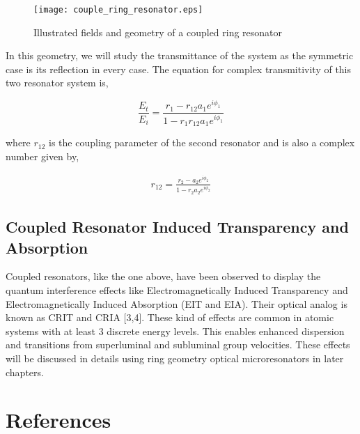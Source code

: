 \begin{figure}[h]
\centering
\texttt{[image: couple\_ring\_resonator.eps]}
\caption{Illustrated fields and geometry of a coupled ring resonator}
\end{figure}

In this geometry, we will study the transmittance of the system as the symmetric case is its reflection in every case. The equation for complex transmitivity of this two resonator system is,

\begin{equation}
\frac{E_{t}}{E_{i}} = \frac{r_{1} - r_{12} a_{1} e^{i\phi_{1}}}{1 - r_{1} r_{12} a_{1} e^{i\phi_{1}}}
\end{equation}

where $r_{12}$ is the coupling parameter of the second resonator and is also a complex number given by,

\begin{align*}
r_{12} = \frac{r_{2} - a_{2} e^{i\phi_{2}}}{1 - r_{2} a_{2} e^{i\phi_{2}}}
\end{align*}


\subsection{Coupled Resonator Induced Transparency and Absorption}
Coupled resonators, like the one above, have been observed to display the quantum interference effects like Electromagnetically Induced Transparency and Electromagnetically Induced Absorption (EIT and EIA). Their optical analog is known as CRIT and CRIA [3,4]. These kind of effects are common in atomic systems with at least 3 discrete energy levels. This enables enhanced dispersion and transitions from superluminal and subluminal group velocities. These effects will be discussed in details using ring geometry optical microresonators in later chapters.

\newpage
\section*{References}
